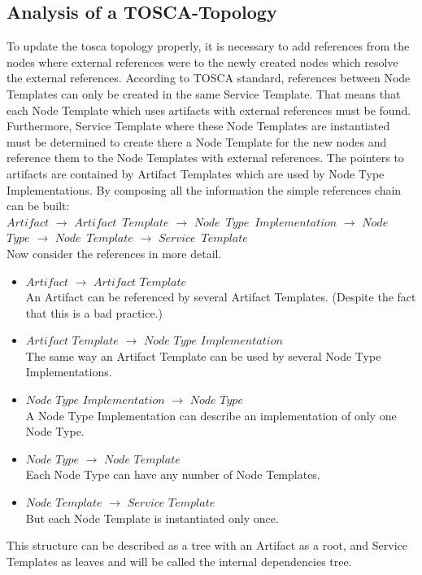 \subsection{Analysis of a TOSCA-Topology}\label{subs:analyse}
To update the \gls{tosca} topology properly, it is necessary to add references from the nodes where external references were to the newly created nodes which resolve the external references. 
According to TOSCA standard, references between Node Templates can only be created in the same Service Template.  
That means that each Node Template which uses artifacts with external references must be found.
Furthermore, Service Template where these Node Templates are instantiated must be determined to create there a Node Template for the new nodes and reference them to the Node Templates with external references.
The pointers to artifacts are contained by Artifact Templates which are used by Node Type Implementations.
By composing all the information the simple references chain can be built:\\
$Artifact$ $\rightarrow$ $Artifact$~$Template$ $\rightarrow$ $Node$~$Type$~$Implementation$ $\rightarrow$ $Node$~$Type$ $\rightarrow$ $Node$~$Template$ $\rightarrow$ $Service$~$Template$\\
Now consider the references in more detail. 
\begin{itemize}
	\item $Artifact$ $\rightarrow$ $Artifact$ $Template$\\
	An Artifact can be referenced by several Artifact Templates. (Despite the fact that this is a bad practice.)
	\item  $Artifact$ $Template$ $\rightarrow$ $Node$ $Type$ $Implementation$ \\
	The same way an Artifact Template can be used by several Node Type Implementations.
	\item $Node$ $Type$ $Implementation$ $\rightarrow$ $Node$ $Type$ \\
	A Node Type Implementation can describe an implementation of only one Node Type.
	\item  $Node$ $Type$ $\rightarrow$ $Node$ $Template$\\
	Each Node Type can have any number of Node Templates.
	\item  $Node$ $Template$ $\rightarrow$ $Service$ $Template$\\
	But each Node Template is instantiated only once.
\end{itemize}
This structure can be described as a tree with an Artifact as a root, and Service Templates as leaves and will be called the internal dependencies tree.
